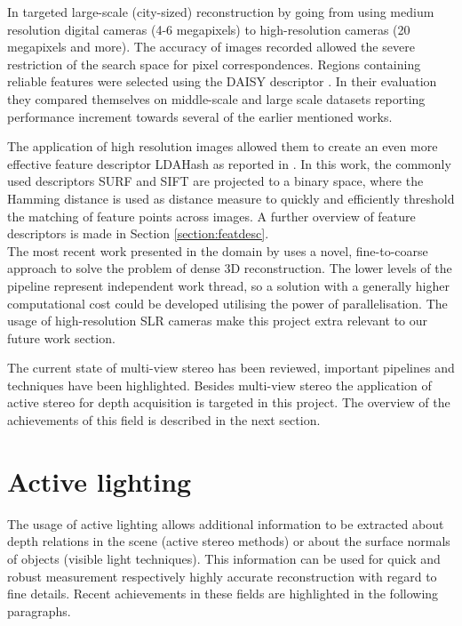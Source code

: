 \documentclass{ucl_thesis}
\begin{document}
In \cite{Tola12} targeted large-scale (city-sized) reconstruction by going from using medium resolution digital cameras (4-6 megapixels) to high-resolution cameras (20 megapixels and more). The accuracy of images recorded allowed the severe restriction of the search space for pixel correspondences. Regions containing reliable features were selected using the DAISY descriptor \cite{Tola10daisy:an}. In their evaluation they compared themselves on middle-scale and large scale datasets reporting performance increment towards several of the earlier mentioned works. 
\par The application of high resolution images allowed them to create an even more effective feature descriptor LDAHash as reported in \cite{Strecha12}. In this work, the commonly used descriptors SURF and SIFT are projected to a binary space, where the Hamming distance is used as distance measure to quickly and efficiently threshold the matching of feature points across images. A further overview of feature descriptors is made in Section \ref{section:featdesc}. \\

The most recent work presented in the domain by \citep{Kim:2013} uses a novel, fine-to-coarse approach to solve the problem of dense 3D reconstruction. The lower levels of the pipeline represent independent work thread, so a solution with a generally higher computational cost could be developed utilising the power of parallelisation. The usage of high-resolution SLR cameras make this project extra relevant to our future work section.

\par The current state of multi-view stereo has been reviewed, important pipelines and techniques have been highlighted. Besides multi-view stereo the application of active stereo for depth acquisition is targeted in this project. The overview of the achievements of this field is described in the next section.

\section{Active lighting}
 The usage of active lighting allows additional information to be extracted about depth relations in the scene (active stereo methods) or about the surface normals of objects (visible light techniques). This information can be used for quick and robust measurement respectively highly accurate reconstruction with regard to fine details. Recent achievements in these fields are highlighted in the following paragraphs.
 
\end{document}
